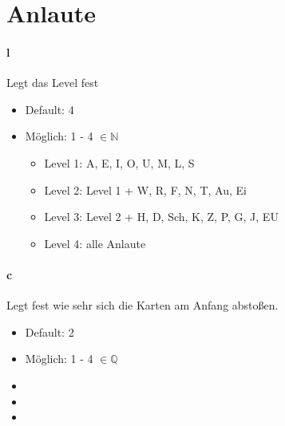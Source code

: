 \documentclass[]{article}
\begin{document}
\section{Anlaute}
\begin{multicols}{2}
	\paragraph{l} Legt das Level fest
	\begin{itemize}
		\item Default:  4
		\item Möglich:  1 - 4 $\in \mathbb{N}$
			\begin{itemize}
				\item Level 1:  A, E, I, O, U, M, L, S
				\item Level 2:  Level 1 + W, R, F, N, T, Au, Ei
				\item Level 3:  Level 2 + H, D, Sch, K, Z, P, G, J, EU
				\item Level 4:  alle Anlaute
			\end{itemize}
	\end{itemize}

	\paragraph{c} Legt fest wie sehr sich die Karten am Anfang abstoßen.
	\begin{itemize}
		\item Default:  2
		\item Möglich:  1 - 4 $\in \mathbb{Q}$
		\item[]
		\item[]
		\item[]
	\end{itemize}
\end{multicols}
\end{document}
